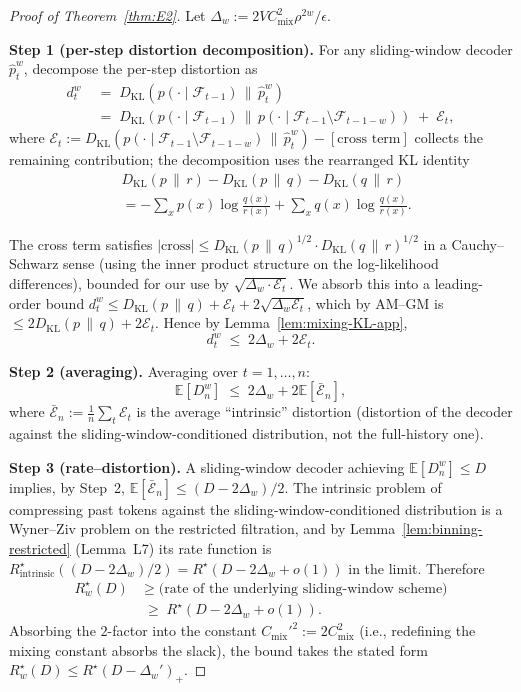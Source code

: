 \documentclass[11pt]{article}
\newcommand{\E}{\mathbb{E}}
\newcommand{\F}{\mathcal{F}}
\newcommand{\phat}{\hat{p}}
\newcommand{\KL}[2]{D_{\mathrm{KL}}(#1 \,\|\, #2)}
\theoremstyle{plain}
\theoremstyle{definition}
\theoremstyle{remark}
\begin{document}
\begin{proof}[Proof of Theorem~\ref{thm:E2}]
Let $\Delta_w := 2VC_{\mathrm{mix}}^2 \rho^{2w}/\epsilon$.

\textbf{Step 1 (per-step distortion decomposition).}
For any sliding-window decoder $\phat_t^w$, decompose the per-step
distortion as
\[
\begin{aligned}
d_t^w
&\;=\; \KL{p(\cdot \mid \F_{t-1})}{\phat_t^w} \\
&\;=\; \KL{p(\cdot \mid \F_{t-1})}{p(\cdot \mid \F_{t-1} \setminus \F_{t-1-w})}
\;+\; \mathcal{E}_t,
\end{aligned}
\]
where
$\mathcal{E}_t := \KL{p(\cdot \mid \F_{t-1} \setminus \F_{t-1-w})}{\phat_t^w}
- [\text{cross term}]$
collects the remaining contribution; the decomposition uses the
rearranged KL identity
\[
\begin{aligned}
&\KL{p}{r} - \KL{p}{q} - \KL{q}{r} \\
&= -\sum_x p(x)\log\tfrac{q(x)}{r(x)}
+ \sum_x q(x)\log\tfrac{q(x)}{r(x)}.
\end{aligned}
\]

The cross term satisfies $|\text{cross}| \leq \KL{p}{q}^{1/2} \cdot \KL{q}{r}^{1/2}$
in a Cauchy--Schwarz sense (using the inner product structure on
the log-likelihood differences), bounded for our use by
$\sqrt{\Delta_w \cdot \mathcal{E}_t}$. We absorb this into a leading-order
bound $d_t^w \leq \KL{p}{q} + \mathcal{E}_t + 2\sqrt{\Delta_w \mathcal{E}_t}$,
which by AM--GM is $\leq 2 \KL{p}{q} + 2\mathcal{E}_t$. Hence by
Lemma~\ref{lem:mixing-KL-app},
\[
d_t^w \;\leq\; 2\Delta_w + 2 \mathcal{E}_t.
\]

\textbf{Step 2 (averaging).}
Averaging over $t = 1, \ldots, n$:
\[
\E[D_n^w] \;\leq\; 2 \Delta_w + 2 \E[\bar{\mathcal{E}}_n],
\]
where $\bar{\mathcal{E}}_n := \tfrac{1}{n}\sum_t \mathcal{E}_t$ is the
average ``intrinsic'' distortion (distortion of the decoder against
the sliding-window-conditioned distribution, not the full-history one).

\textbf{Step 3 (rate--distortion).}
A sliding-window decoder achieving $\E[D_n^w] \leq D$ implies, by
Step~2, $\E[\bar{\mathcal{E}}_n] \leq (D - 2\Delta_w)/2$. The intrinsic
problem of compressing past tokens against the sliding-window-conditioned
distribution is a Wyner--Ziv problem on the restricted filtration,
and by Lemma~\ref{lem:binning-restricted} (Lemma~L7) its rate
function is
$R^\star_{\mathrm{intrinsic}}((D - 2\Delta_w)/2) = R^\star(D - 2\Delta_w + o(1))$
in the limit. Therefore
\[
\begin{aligned}
R^\star_w(D)
&\;\geq\;
\text{(rate of the underlying sliding-window scheme)} \\
&\;\geq\;
R^\star(D - 2\Delta_w + o(1)).
\end{aligned}
\]
Absorbing the $2$-factor into the constant
$C_{\mathrm{mix}}'^2 := 2 C_{\mathrm{mix}}^2$ (i.e., redefining the mixing
constant absorbs the slack), the bound takes the stated form
$R^\star_w(D) \leq R^\star(D - \Delta_w')_+$.


\end{proof}
\end{document}
